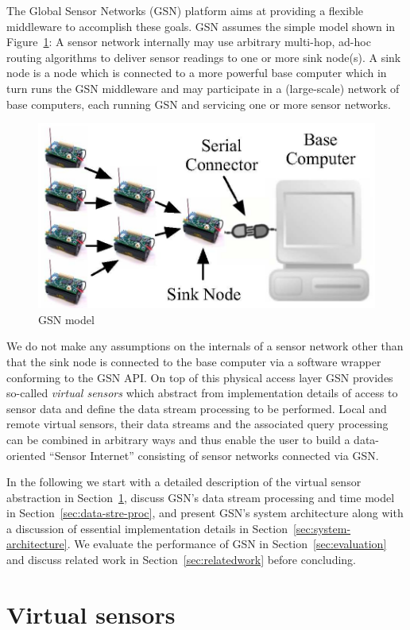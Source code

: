 The Global Sensor Networks (GSN) platform aims at providing a flexible
middleware to accomplish these goals.  GSN assumes the simple model
shown in Figure~\ref{fig:setup}: A sensor network internally may use
arbitrary multi-hop, ad-hoc routing algorithms to deliver sensor
readings to one or more sink node(s). A sink node is a node which is
connected to a more powerful base computer which in turn runs the GSN
middleware and may participate in a (large-scale) network of base
computers, each running GSN and servicing one or more sensor networks.

\begin{figure}
  \centering
  \includegraphics[width=0.5\columnwidth]{ch-gsn-figures/model}
  \caption{GSN model}
  \label{fig:setup}
\end{figure}

We do not make any assumptions on the internals of a sensor network
other than that the sink node is connected to the base computer via a
software wrapper conforming to the GSN API. On top of this physical
access layer GSN provides so-called \textit{virtual sensors} which
abstract from implementation details of access to sensor data and
define the data stream processing to be performed. Local and remote
virtual sensors, their data streams and the associated query
processing can be combined in arbitrary ways and thus enable the user
to build a data-oriented ``Sensor Internet'' consisting of sensor
networks connected via GSN.

In the following we start with a detailed description of the virtual
sensor abstraction in Section~\ref{sec:virt-sens-spec}, discuss GSN's
data stream processing and time model in
Section~\ref{sec:data-stre-proc}, and present GSN's system architecture
along with a discussion of essential implementation details
in Section~\ref{sec:system-architecture}. We
evaluate the performance of GSN in Section~\ref{sec:evaluation} and
discuss related work in Section~\ref{sec:relatedwork} before
concluding.

\section{Virtual sensors}
\label{sec:virt-sens-spec}

